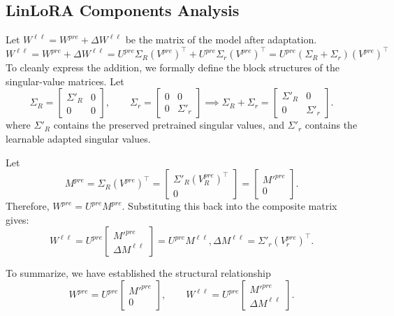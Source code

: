 \subsection{LinLoRA Components Analysis}

Let $W^{\ell \ell} = W^{pre} + \Delta W^{\ell \ell}$ be the matrix of the model after adaptation.
\[
W^{\ell \ell}
= W^{pre} + \Delta W^{\ell \ell}
= U^{pre}\Sigma_R (V^{pre})^\top + U^{pre} \Sigma_r (V^{pre})^\top
= U^{pre}(\Sigma_R + \Sigma_r)(V^{pre})^\top
\]
To cleanly express the addition, we formally define the block structures of the singular-value matrices. Let
\[
\Sigma_R =
\begin{bmatrix}
\Sigma'_R & 0 \\
0 & 0
\end{bmatrix},
\qquad
\Sigma_r =
\begin{bmatrix}
0 & 0 \\
0 & \Sigma'_r
\end{bmatrix}
\implies
\Sigma_R + \Sigma_r
=
\begin{bmatrix}
\Sigma'_R & 0 \\
0 & \Sigma'_r
\end{bmatrix}.
\]
where $\Sigma'_R$ contains the preserved pretrained singular values, and $\Sigma'_r$ contains the learnable adapted singular values.

Let
\[
M^{pre}
=
\Sigma_R(V^{pre})^\top
=
\begin{bmatrix}
\Sigma'_R (V_R^{pre})^\top \\
0
\end{bmatrix}
=
\begin{bmatrix}
M'^{pre} \\
0
\end{bmatrix}.
\]
Therefore, $W^{pre}=U^{pre}M^{pre}$. Substituting this back into the composite matrix gives:
\[
W^{\ell \ell}
=
U^{pre}
\begin{bmatrix}
M'^{pre} \\
\Delta M^{\ell \ell}
\end{bmatrix}
=
U^{pre}M^{\ell \ell},
\Delta M^{\ell \ell}
=
\Sigma'_r (V_r^{pre})^\top.
\]

To summarize, we have established the structural relationship
\[
W^{pre}
=
U^{pre}
\begin{bmatrix}
M'^{pre} \\
0
\end{bmatrix},
\qquad
W^{\ell \ell}
=
U^{pre}
\begin{bmatrix}
M'^{pre} \\
\Delta M^{\ell \ell}
\end{bmatrix}.
\]

